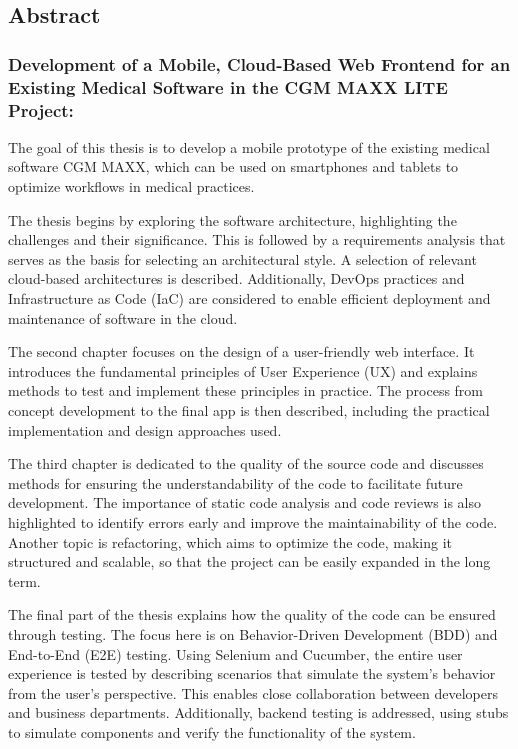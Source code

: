 \begin{flushleft}
	
	\subsection*{Abstract}

	\subsubsection*{Development of a Mobile, Cloud-Based Web Frontend for an Existing Medical Software in the CGM MAXX LITE Project:}

    The goal of this thesis is to develop a mobile prototype of the existing medical software CGM MAXX, which can be used on smartphones and tablets to optimize workflows in medical practices.

    The thesis begins by exploring the software architecture, highlighting the challenges and their significance. This is followed by a requirements analysis that serves as the basis for selecting an architectural style. A selection of relevant cloud-based architectures is described. Additionally, DevOps practices and Infrastructure as Code (IaC) are considered to enable efficient deployment and maintenance of software in the cloud.
    
    The second chapter focuses on the design of a user-friendly web interface. It introduces the fundamental principles of User Experience (UX) and explains methods to test and implement these principles in practice. The process from concept development to the final app is then described, including the practical implementation and design approaches used.
    
    The third chapter is dedicated to the quality of the source code and discusses methods for ensuring the understandability of the code to facilitate future development. The importance of static code analysis and code reviews is also highlighted to identify errors early and improve the maintainability of the code. Another topic is refactoring, which aims to optimize the code, making it structured and scalable, so that the project can be easily expanded in the long term.
    
    The final part of the thesis explains how the quality of the code can be ensured through testing. The focus here is on Behavior-Driven Development (BDD) and End-to-End (E2E) testing. Using Selenium and Cucumber, the entire user experience is tested by describing scenarios that simulate the system's behavior from the user's perspective. This enables close collaboration between developers and business departments. Additionally, backend testing is addressed, using stubs to simulate components and verify the functionality of the system.

\end{flushleft}